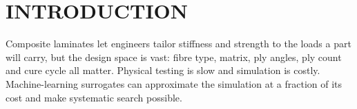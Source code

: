 \chapter{INTRODUCTION}
\label{ch:introduction}

Composite laminates let engineers tailor stiffness and strength to the loads a part will carry,
but the design space is vast: fibre type, matrix, ply angles, ply count and cure cycle all
matter. Physical testing is slow and simulation is costly. Machine-learning surrogates can
approximate the simulation at a fraction of its cost and make systematic search possible.
